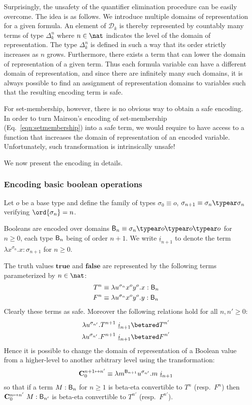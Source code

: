 Surprisingly, the unsafety of the quantifier elimination procedure can be easily overcome. The idea is as follows. We introduce multiple domains of representation for a given formula. An element of $\mathcal{D}_k$ is thereby represented by countably many terms of type $\Delta_k^n$ where $n\in\nat$ indicates the level of the domain of representation. The type $\Delta_k^n$ is defined in such a way that its order strictly increases as $n$ grows. Furthermore, there exists a term that can lower the domain of representation of a given term. Thus each formula variable can have a different domain of representation, and since there are infinitely many such domains, it is always possible to find an assignment of representation domains to variables such that the resulting encoding term is safe.

For set-membership, however, there is no obvious way to obtain a safe encoding. In order to turn Mairson's encoding of set-membership (Eq.\ \ref{eqn:setmembership}) into a safe term, we would require to have access to a function that increases the domain of representation of an encoded variable. Unfortunately, such transformation is intrinsically unsafe!
\smallskip

We now present the encoding in details.

\subsubsection{Encoding basic boolean operations}

Let $o$ be a base type and define the family of types $\sigma_0 \equiv o$, $\sigma_{n+1} \equiv \sigma_n\typear\sigma_n$ verifying $\ord{\sigma_n} = n$.


Booleans are encoded over domains $\booltype_n \equiv \sigma_n\typear o\typear o\typear o$ for $n\geq0$, each type $\mathsf{B}_n$ being of order $n+1$. We write $\underline{i}_{n+1}$ to denote the term $\lambda x^{\sigma_n}.x : \sigma_{n+1}$ for $n\geq0$.

The truth values $\mathbf{true}$ and $\mathbf{false}$ are represented by the following terms parameterized by $n \in \nat$:
\begin{align*}
  T^n &\equiv \lambda u^{\sigma_n} x^o y^o .x : \mathsf{B}_{n}\\
  F^n &\equiv \lambda u^{\sigma_n} x^o y^o .y : \mathsf{B}_{n}
\end{align*}
Clearly these terms as safe. Moreover the following relations hold for all $n,n'\geq 0$:
\begin{align*}
  \lambda u^{\sigma_{n'}} . T^{n+1}~\underline{i}_{n+1}  &\betared  T^{n'} \\
  \lambda u^{\sigma_{n'}} . F^{n+1}~\underline{i}_{n+1}  &\betared  F^{n'}
\end{align*}
Hence it is possible to change the domain of representation of a Boolean value from a higher-level to another arbitrary level using the transformation:
$$ \mathbf{C}^{n+1\mapsto n'}_0 \equiv \lambda m^{\mathsf{B}_{n+1}} u^{\sigma_{n'}}. m~\underline{i}_{n+1}$$
so that if a term $M : \mathsf{B}_n$ for $n\geq1$ is beta-eta convertible to $T^n$ (resp.\ $F^n$) then $\mathbf{C}^{n\mapsto n'}_0~M :\mathsf{B}_{n'}$ is beta-eta convertible to $T^{n'}$ (resp.\ $F^{n'}$).

